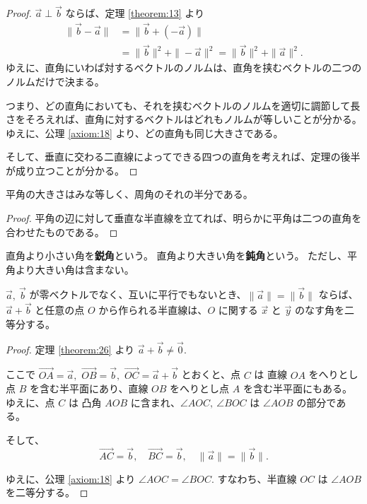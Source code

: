\begin{proof}
  \(\vec{a}\perp\vec{b}\) ならば、定理 \ref{theorem:13} より
  \begin{align*}
    \|\vec{b}-\vec{a}\| &= \|\vec{b}+(-\vec{a})\| \\
                        &= \|\vec{b}\|^2+\|-\vec{a}\|^2= \|\vec{b}\|^2+\|\vec{a}\|^2.
  \end{align*}
  ゆえに、直角にいわば対するベクトルのノルムは、直角を挟むベクトルの二つのノルムだけで決まる。

  つまり、どの直角においても、それを挟むベクトルのノルムを適切に調節して長さをそろえれば、直角に対するベクトルはどれもノルムが等しいことが分かる。
  ゆえに、公理 \ref{axiom:18} より、どの直角も同じ大きさである。

  そして、垂直に交わる二直線によってできる四つの直角を考えれば、定理の後半が成り立つことが分かる。
\end{proof}

\begin{thm}\label{theorem:35}
  平角の大きさはみな等しく、周角のそれの半分である。
\end{thm}

\begin{proof}
  平角の辺に対して垂直な半直線を立てれば、明らかに平角は二つの直角を合わせたものである。
\end{proof}

\begin{dfn}[鋭角、鈍角]\label{definition:28}
  直角より小さい角を\textbf{鋭角}という。
  直角より大きい角を\textbf{鈍角}という。
  ただし、平角より大きい角は含まない。
\end{dfn}

\begin{lmm}\label{lemma:1}
 \(\vec{a},\ \vec{b}\) が零ベクトルでなく、互いに平行でもないとき、\(\|\vec{a}\|=\|\vec{b}\|\) ならば、\(\vec{a}+\vec{b}\) と任意の点 \(O\) から作られる半直線は、\(O\) に関する \(\vec{x}\) と \(\vec{y}\) のなす角を二等分する。
\end{lmm}

\begin{proof}
  定理 \ref{theorem:26} より \(\vec{a}+\vec{b}\neq\vec{0}.\)

  ここで \(\overrightarrow{OA}=\vec{a},\) \(\overrightarrow{OB}=\vec{b},\) \(\overrightarrow{OC}=\vec{a}+\vec{b}\) とおくと、点 \(C\) は 直線 \(OA\) をへりとし点 \(B\) を含む半平面にあり、直線 \(OB\) をへりとし点 \(A\) を含む半平面にもある。
  ゆえに、点 \(C\) は 凸角 \(AOB\) に含まれ、\(\angle{AOC},\ \angle{BOC}\) は \(\angle{AOB}\) の部分である。

  そして、
  \[\overrightarrow{AC}=\vec{b},\quad \overrightarrow{BC}=\vec{b},\quad \|\vec{a}\|=\|\vec{b}\|.\]

  ゆえに、公理 \ref{axiom:18} より \(\angle{AOC}=\angle{BOC}.\)
  すなわち、半直線 \(OC\) は \(\angle{AOB}\) を二等分する。
\end{proof}

